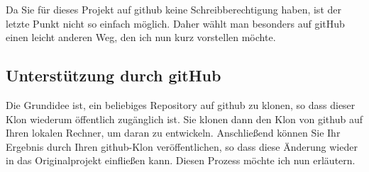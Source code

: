 Da Sie für dieses Projekt auf github keine Schreibberechtigung haben, ist der letzte Punkt nicht so einfach möglich. Daher wählt man besonders auf gitHub einen leicht anderen Weg, den ich nun kurz vorstellen möchte.

\subsection{Unterstützung durch gitHub}
Die Grundidee ist, ein beliebiges Repository auf github zu klonen, so dass dieser Klon wiederum öffentlich zugänglich ist. Sie klonen dann den Klon von github auf Ihren lokalen Rechner, um daran zu entwickeln. Anschließend können Sie Ihr Ergebnis durch Ihren github-Klon veröffentlichen, so dass diese Änderung wieder in das Originalprojekt einfließen kann. Diesen Prozess möchte ich nun erläutern.

